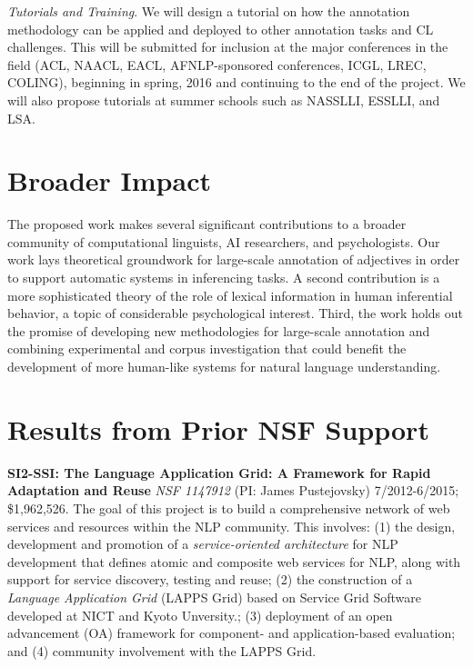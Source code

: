 \documentclass[10pt]{article}
\newcommand{\miniskip}{\vspace*{1mm}}
\begin{document}
{\it Tutorials and Training}.
We will design a tutorial on how the annotation methodology can be applied and deployed to other annotation tasks and CL challenges. This will be submitted for inclusion at the major conferences in the field (ACL, NAACL, EACL, AFNLP-sponsored conferences, ICGL, LREC, COLING), beginning in spring, 2016 and continuing to the end of the project. We will also propose tutorials at summer schools such as NASSLLI, ESSLLI, and LSA. 

\vspace {-5mm}
\section{Broader Impact}

\vspace {-3mm}

The proposed work  makes several significant contributions to a broader community of computational linguists, AI researchers, and psychologists. 
Our work lays theoretical groundwork for large-scale annotation of adjectives in order to support automatic systems in inferencing tasks. 
A second contribution is a more sophisticated theory of the role of lexical information in human inferential behavior, a topic of considerable psychological interest.
Third, the work holds out the promise of developing new methodologies for large-scale annotation and combining experimental and corpus investigation that could benefit the development of more human-like systems for natural language understanding.
  
\vspace {-5mm}
\section{Results from Prior NSF Support}

\vspace {-3mm}

\noindent
 {\bf SI2-SSI: The Language Application Grid: A Framework for Rapid Adaptation and Reuse} 
{\it NSF 1147912} (PI: James Pustejovsky) 7/2012-6/2015; \$1,962,526.
The goal of this  project is to  build  a comprehensive network of web services and resources within the NLP community. This involves:
(1) the design, development  and promotion of a {\it service-oriented architecture} for NLP development that defines atomic and composite web services for NLP, along with support for service discovery, testing and reuse; (2)  the construction of a {\it Language Application Grid} (LAPPS Grid) based on Service Grid Software developed at NICT and Kyoto Unversity.; (3)  deployment of an open advancement (OA) framework for
component- and application-based evaluation; and  (4)   community involvement with the LAPPS Grid.  
\end{document}
